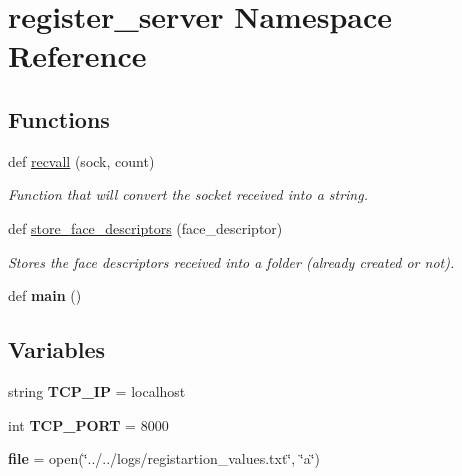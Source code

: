 \hypertarget{namespaceregister__server}{}\section{register\+\_\+server Namespace Reference}
\label{namespaceregister__server}
\subsection*{Functions}
\begin{DoxyCompactItemize}
\item 
def \hyperlink{namespaceregister__server_a67bb86c0ff90fdf0fd4c77fa7eeeb1c1}{recvall} (sock, count)
\begin{DoxyCompactList}\small\item\em Function that will convert the socket received into a string. \end{DoxyCompactList}\item 
def \hyperlink{namespaceregister__server_aaeeebb60db8fa707bc7403a86e231acc}{store\+\_\+face\+\_\+descriptors} (face\+\_\+descriptor)
\begin{DoxyCompactList}\small\item\em Stores the face descriptors received into a folder (already created or not). \end{DoxyCompactList}\item 
def {\bfseries main} ()\hypertarget{namespaceregister__server_a26e195fba8c006144aada4daa696e181}{}\label{namespaceregister__server_a26e195fba8c006144aada4daa696e181}

\end{DoxyCompactItemize}
\subsection*{Variables}
\begin{DoxyCompactItemize}
\item 
string {\bfseries T\+C\+P\+\_\+\+IP} = \textquotesingle{}localhost\textquotesingle{}\hypertarget{namespaceregister__server_afb99a27b92f7b32543a70d6b8b189c70}{}\label{namespaceregister__server_afb99a27b92f7b32543a70d6b8b189c70}

\item 
int {\bfseries T\+C\+P\+\_\+\+P\+O\+RT} = 8000\hypertarget{namespaceregister__server_aa32c493cf1ca9f8772cd6a02ceba5448}{}\label{namespaceregister__server_aa32c493cf1ca9f8772cd6a02ceba5448}

\item 
{\bfseries file} = open(\char`\"{}../../logs/registartion\+\_\+values.\+txt\char`\"{}, \char`\"{}a\char`\"{})\hypertarget{namespaceregister__server_a1ce278a25a44911c33f8320c7cb50d58}{}\label{namespaceregister__server_a1ce278a25a44911c33f8320c7cb50d58}

\end{DoxyCompactItemize}


